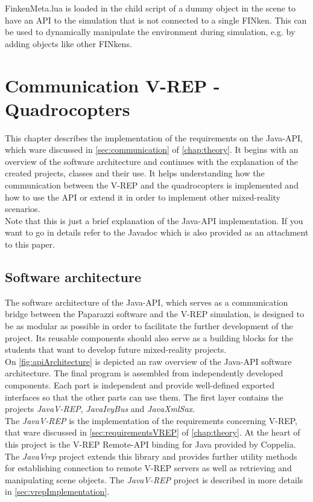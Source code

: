 FinkenMeta.lua is loaded in the child script of a dummy object in the scene  to have an API to the simulation that is not connected to a single FINken. This can be used to dynamically manipulate the environment during simulation, e.g. by adding objects like other FINkens.

\section{Communication V-REP - Quadrocopters}
\label{sec:commImplementation}

This chapter describes the implementation of the requirements on the Java-API, which ware discussed in \ref{sec:communication} of \ref{chap:theory}. It begins with an overview of the software architecture and continues with the explanation of the created projects, classes and their use. It helps understanding how the communication between the V-REP and the quadrocopters is implemented and how to use the API or extend it in order to implement other mixed-reality scenarios.\\
Note that this is just a brief explanation of the Java-API implementation. If you want to go in details refer to the Javadoc which is also provided as an attachment to this paper.

\subsection{Software architecture}

The software architecture of the Java-API, which serves as a communication bridge between the Paparazzi software and the V-REP simulation, is designed to be as modular as possible in order to facilitate the further development of the project. Its reusable components should also serve as a building blocks for the students that want to develop future mixed-reality projects. \\

On \ref{fig:apiArchitecture} is depicted an raw overview of the Java-API software architecture.
The final program is assembled from independently developed components. Each part is independent and provide well-defined exported interfaces so that the other parts can use them.
The first layer contains the projects \textit{JavaV-REP}, \textit{JavaIvyBus} and \textit{JavaXmlSax}.\\
The \textit{JavaV-REP} is the implementation of the requirements concerning V-REP, that ware discussed in \ref{sec:requirementsVREP} of \ref{chap:theory}. At the heart of this project is the V-REP Remote-API binding for Java provided by Coppelia. The \textit{JavaVrep} project extends this library and provides further utility methods for establishing connection to remote V-REP servers as well as retrieving and manipulating scene objects. The \textit{JavaV-REP} project is described in more details in \ref{sec:vrepImplementation}.\\

